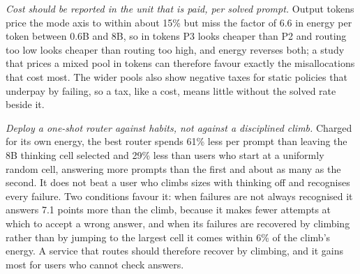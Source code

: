 \emph{Cost should be reported in the unit that is paid, per solved prompt.}
Output tokens price the mode axis to within about 15\% but miss the factor of
6.6 in energy per token between 0.6B and 8B, so in tokens P3 looks cheaper
than P2 and routing too low looks cheaper than routing too high, and energy
reverses both; a study that prices a mixed pool in tokens can therefore
favour exactly the misallocations that cost most. The wider pools also show
negative taxes for static policies that underpay by failing, so a tax, like a
cost, means little without the solved rate beside it.

\emph{Deploy a one-shot router against habits, not against a disciplined
climb.} Charged for its own energy, the best router spends 61\% less per
prompt than leaving the 8B thinking cell selected and 29\% less than users
who start at a uniformly random cell, answering more prompts than the first
and about as many as the second. It does not beat a user who climbs sizes
with thinking off and recognises every failure. Two conditions favour it:
when failures are not always recognised it answers 7.1 points more than the
climb, because it makes fewer attempts at which to accept a wrong answer, and
when its failures are recovered by climbing rather than by jumping to the
largest cell it comes within 6\% of the climb's energy. A service that routes
should therefore recover by climbing, and it gains most for users who cannot
check answers.
